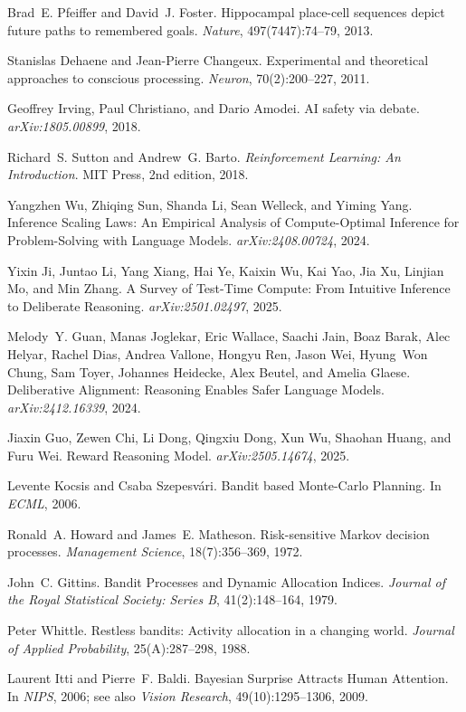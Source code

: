 \documentclass[11pt]{article}
\newcommand{\1}{\mathbb{I}}
\begin{document}
\begin{thebibliography}{10}
Brad~E. Pfeiffer and David~J. Foster.
\newblock Hippocampal place-cell sequences depict future paths to remembered goals.
\newblock \emph{Nature}, 497(7447):74--79, 2013.

Stanislas Dehaene and Jean-Pierre Changeux.
\newblock Experimental and theoretical approaches to conscious processing.
\newblock \emph{Neuron}, 70(2):200--227, 2011.

Geoffrey Irving, Paul Christiano, and Dario Amodei.
\newblock AI safety via debate.
\newblock \emph{arXiv:1805.00899}, 2018.

Richard~S. Sutton and Andrew~G. Barto.
\newblock \emph{Reinforcement Learning: An Introduction}.
\newblock MIT Press, 2nd edition, 2018.

Yangzhen Wu, Zhiqing Sun, Shanda Li, Sean Welleck, and Yiming Yang.
\newblock Inference Scaling Laws: An Empirical Analysis of Compute-Optimal Inference for Problem-Solving with Language Models.
\newblock \emph{arXiv:2408.00724}, 2024.

Yixin Ji, Juntao Li, Yang Xiang, Hai Ye, Kaixin Wu, Kai Yao, Jia Xu, Linjian Mo, and Min Zhang.
\newblock A Survey of Test-Time Compute: From Intuitive Inference to Deliberate Reasoning.
\newblock \emph{arXiv:2501.02497}, 2025.

Melody~Y. Guan, Manas Joglekar, Eric Wallace, Saachi Jain, Boaz Barak, Alec Helyar, Rachel Dias, Andrea Vallone, Hongyu Ren, Jason Wei, Hyung~Won Chung, Sam Toyer, Johannes Heidecke, Alex Beutel, and Amelia Glaese.
\newblock Deliberative Alignment: Reasoning Enables Safer Language Models.
\newblock \emph{arXiv:2412.16339}, 2024.

Jiaxin Guo, Zewen Chi, Li Dong, Qingxiu Dong, Xun Wu, Shaohan Huang, and Furu Wei.
\newblock Reward Reasoning Model.
\newblock \emph{arXiv:2505.14674}, 2025.

Levente Kocsis and Csaba Szepesv\'ari.
\newblock Bandit based Monte-Carlo Planning.
\newblock In \emph{ECML}, 2006.

Ronald~A. Howard and James~E. Matheson.
\newblock Risk-sensitive Markov decision processes.
\newblock \emph{Management Science}, 18(7):356--369, 1972.

John~C. Gittins.
\newblock Bandit Processes and Dynamic Allocation Indices.
\newblock \emph{Journal of the Royal Statistical Society: Series B}, 41(2):148--164, 1979.

Peter Whittle.
\newblock Restless bandits: Activity allocation in a changing world.
\newblock \emph{Journal of Applied Probability}, 25(A):287--298, 1988.

Laurent Itti and Pierre~F. Baldi.
\newblock Bayesian Surprise Attracts Human Attention.
\newblock In \emph{NIPS}, 2006; see also \emph{Vision Research}, 49(10):1295--1306, 2009.

\end{thebibliography}
\end{document}
